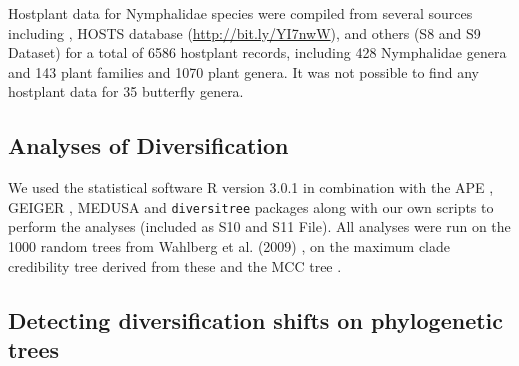 \documentclass[10pt,letterpaper]{article}
\begin{document}
Hostplant data for Nymphalidae species were compiled from several
sources including \cite{ackery1988}, HOSTS database (\url{http://bit.ly/YI7nwW}),
\cite{dyer2002, beccaloni2008, janzen2009} and others (S8 and S9 Dataset) for a
total of 6586
hostplant records, including 428 Nymphalidae genera and 143 plant
families and 1070 plant genera. It was not possible to find any
hostplant data for 35 butterfly genera.



\subsection*{Analyses of Diversification}

We used the statistical software R version 3.0.1 \cite{r2013} in combination
with the APE \cite{popescu2012}, GEIGER \cite{harmon2008}, MEDUSA
\cite{alfaro2009} and
\texttt{diversitree} \cite{fitzjohn2012} packages along with our own scripts to
perform the analyses (included as S10 and S11 File). All
analyses were run on the 1000 random trees from Wahlberg et al. (2009)
\cite{wahlberg2009}, on the maximum clade credibility tree derived from these and
the MCC tree \cite{wahlberg2009}.


\subsection*{Detecting diversification shifts on phylogenetic trees}
\end{document}
